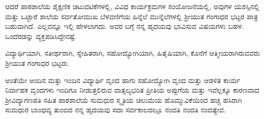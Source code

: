 {ಆದರೆ ಪಾಠಶಾಲೆಯ ಶೈಕ್ಷಣಿಕ ಚಟುವಟಿಕೆಗಳಲ್ಲಿ, ವಿವಿಧ ಕಾರ್ಯಕ್ರಮಗಳ ಸಂಯೋಜನೆಯಲ್ಲಿ, ಅವುಗಳ ಯಶಸ್ಸಿನಲ್ಲಿ ಮತ್ತು ಒಟ್ಟಾರೆ ಶಾಲೆಯ ಸರ್ವತೋಮುಖ ಬೆಳವಣಿಗೆಯ ಹಿನ್ನೆಲೆ ಮುನ್ನೆಲೆಗಳಲ್ಲಿ ಶ್ರೀಯುತ ಗಂಗಾಧರ ಭಟ್ಟರ ಪಾತ್ರ ಬಹುವಾಗಿದೆ. ಎಲ್ಲವನ್ನೂ ಇಲ್ಲಿ ಹೇಳಲಾಗದು. ಅವರ ಬಗ್ಗೆ ನನ್ನ ಹೃದಯವು ಭಾವಿಸುವ ವಿಷಯಗಳು ಬಹಳ. ಒಂದೆರಡನ್ನು ವ್ಯಕ್ತಪಡಿಸಿದ್ದೇನಷ್ಟೆ.

ವಿದ್ಯಾರ್ಥಿಯಾಗಿ, ಸತೀರ್ಥರಾಗಿ, ಸ್ನೇಹಿತರಾಗಿ, ಸಹೋದ್ಯೋಗಿಯಾಗಿ, ಹಿತೈಷಿಯಾಗಿ, ಕೊನೆಗೆ ಆತ್ಮೀಯರಾಗಿರುವವರು ಶ್ರೀಯುತ ಗಂಗಾಧರ ಭಟ್ಟರು. 
\eject

ಅಂತೆಯೇ ಅಂದಿನ ಮತ್ತು ಇಂದಿನ ವಿದ್ಯಾರ್ಥಿ ವೃಂದ ಹಾಗು ಸಹೋದ್ಯೋಗಿ ವೃಂದ ಮತ್ತು ಆಡಳಿತ ಕಾರ್ಯ ನಿರ್ವಾಹಕ ವೃಂದಗಳು ಇಂದಿಗೂ ನೀಡುತ್ತಲಿರುವ ವಾತ್ಸಲ್ಯಭರಿತ ಪ್ರೀತಿಯ ಅಪ್ಪುಗೆಯ ಮತ್ತು ಇವೆಲ್ಲಕ್ಕೂ ಕಾರಣವಾದ ಶ್ರೀವಿದ್ಯಾಗಣಪತಿ ಸಹಿತ ಪಾಠಶಾಲೆಯ ಸುಮಧುರ ಸ್ಮೃತಿಯ ಚಿಲುಮೆಯ ಹೊಮ್ಮುವಿಕೆಯಿಂದ ಹಚ್ಚ ಹಸಿರಾಗಿ ಸುಮಧುರ ಬಾಂಧವ್ಯ ತುಂಬಿದ ನನ್ನ ಹೃದಯವು ಸದಾ ಸರ್ವಕಾಲದಲ್ಲೂ  ನಂದತಿ ನಂದತಿ ನಂದತ್ಯೇವ.

\articleend
}
